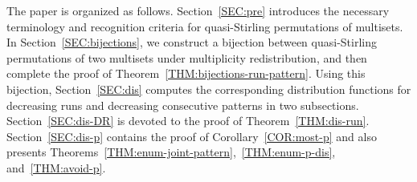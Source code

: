 \documentclass[11pt]{article}
\DeclareMathOperator{\DR}{DR}
\numberwithin{equation}{section}
\begin{document}
The paper is organized as follows. Section~\ref{SEC:pre} introduces the necessary terminology and recognition criteria for quasi-Stirling permutations of multisets. In Section~\ref{SEC:bijections}, we construct a bijection between quasi-Stirling permutations of two multisets under multiplicity redistribution, and then complete the proof of Theorem~\ref{THM:bijections-run-pattern}. Using this bijection, Section~\ref{SEC:dis} computes the corresponding distribution functions for decreasing runs and decreasing consecutive patterns in two subsections. Section~\ref{SEC:dis-DR} is devoted to the proof of Theorem~\ref{THM:dis-run}. Section~\ref{SEC:dis-p} contains the proof of Corollary~\ref{COR:most-p} and also presents Theorems~\ref{THM:enum-joint-pattern},~\ref{THM:enum-p-dis}, and~\ref{THM:avoid-p}.










\end{document}
